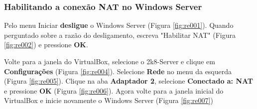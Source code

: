 \documentclass[10pt]{article}
\begin{document}
\subsubsection{Habilitando a conexão NAT no Windows Server}
Pelo menu Iniciar \textbf{desligue} o Windows Server (Figura \ref{fig:re001}). Quando perguntado sobre a razão do desligamento, escreva "Habilitar NAT" (Figura \ref{fig:re002}) e pressione \textbf{OK}. 

\par Volte para a janela do VirtualBox, selecione o 2k8-Server e clique em \textbf{Configurações} (Figura \ref{fig:re004}). Selecione \textbf{Rede} no menu da esquerda (Figura \ref{fig:re005}). Clique na aba \textbf{Adaptador 2}, selecione \textbf{Conectado a: NAT} e pressione \textbf{OK} (Figura \ref{fig:re006}). Agora volte para a janela inicial do VirtualBox e inicie novamente o Windows Server (Figura \ref{fig:re007})
\end{document}
